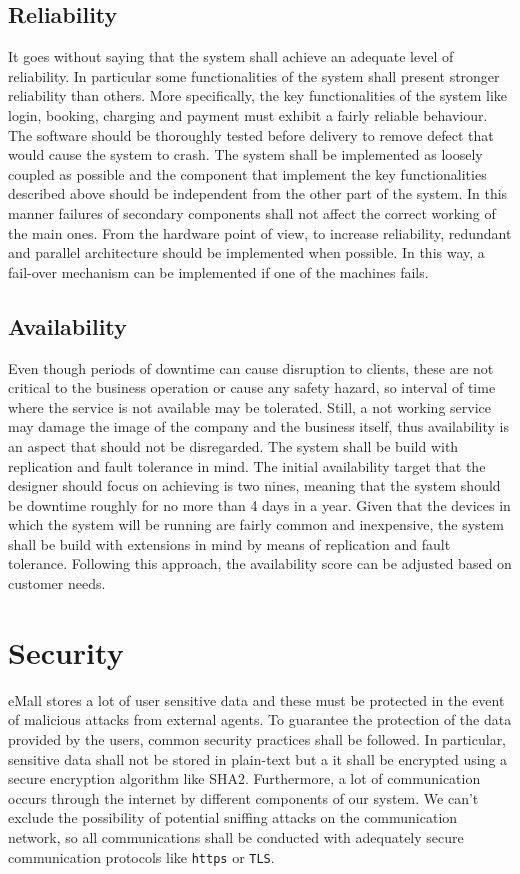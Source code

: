 \subsection{Reliability}
It goes without saying that the system shall achieve an adequate level of reliability. In particular some functionalities of the system shall present stronger reliability than others. More specifically, the key functionalities of the system like login, booking, charging and payment must exhibit a fairly reliable behaviour. The software should be thoroughly tested before delivery to remove defect that would cause the system to crash. The system shall be implemented as loosely coupled as possible and the component that implement the key functionalities described above should be independent from the other part of the system. In this manner failures of secondary components shall not affect the correct working of the main ones. From the hardware point of view, to increase reliability, redundant and parallel architecture should be implemented when possible. In this way, a fail-over mechanism can be implemented if one of the machines fails.

\subsection{Availability}
Even though periods of downtime can cause disruption to clients, these are not critical to the business operation or cause any safety hazard, so interval of time where the service is not available may be tolerated. Still, a not working service may damage the image of the company and the business itself, thus availability is an aspect that should not be disregarded. The system shall be build with replication and fault tolerance in mind. The initial availability target that the designer  should focus on achieving is two nines, meaning that the system should be downtime roughly for no more than 4 days in a year. Given that the devices in which the system will be running are fairly common and inexpensive, the system shall be build with extensions in mind by means of replication and fault tolerance. Following this approach, the availability score can be adjusted based on customer needs.

\section{Security}
eMall stores a lot of user sensitive data and these must be protected in the event of malicious attacks from external agents. To guarantee the protection of the data provided by the users, common security practices shall be followed. In particular, sensitive data shall not be stored in plain-text but a it shall be encrypted using a secure encryption algorithm like SHA2. Furthermore, a lot of communication occurs through the internet  by different components of our system. We can't exclude the possibility of potential sniffing attacks on the communication network, so all communications shall be conducted with adequately secure communication protocols like \verb|https| or \verb|TLS|.


